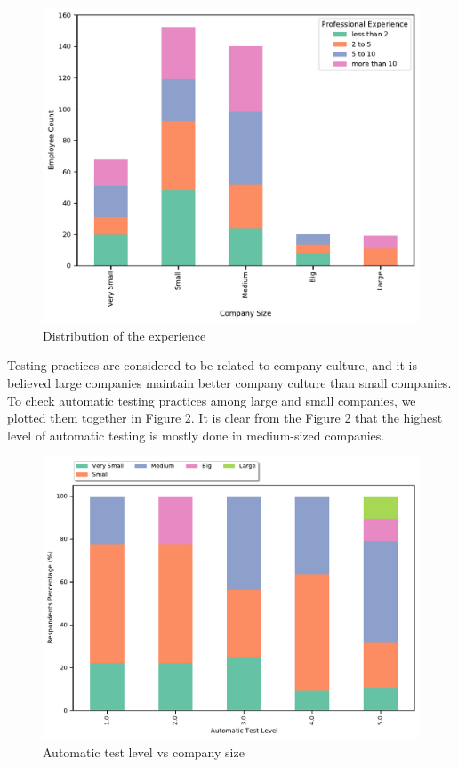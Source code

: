 \begin{figure}[h]
\centering
  \includegraphics[scale=0.45]{Figures/Employee_Company_Size}
  \caption{Distribution of the experience}
  \label{fig:experience and company size}
\end{figure}

Testing practices are considered to be related to company culture, and it is believed large companies maintain better company culture than small companies. To check automatic testing practices among large and small companies, we plotted them together in Figure \ref{fig:auto tets level and company size}. It is clear from the Figure \ref{fig:auto tets level and company size} that the highest level of automatic testing is mostly done in medium-sized companies.

\begin{figure}[h]
\centering
  \includegraphics[scale=0.45]{Figures/Auto_Test_Company_Size.pdf}
  \caption{Automatic test level vs company size}
  \label{fig:auto tets level and company size}
\end{figure}


